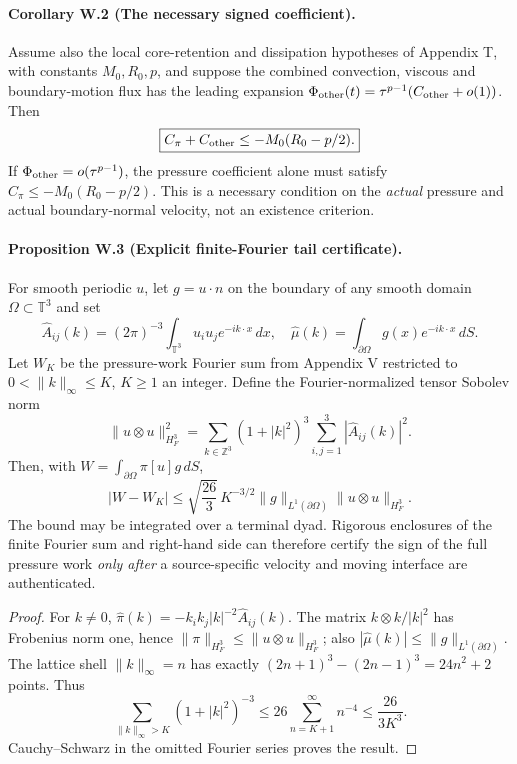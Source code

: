 \paragraph{Corollary W.2 (The necessary signed coefficient).}
Assume also the local core-retention and dissipation hypotheses of Appendix T, with constants $M_0,R_0,p$, and suppose the combined convection, viscous and boundary-motion flux has the leading expansion $\Phi_{\rm other}(t)=\tau^{p-1}(C_{\rm other}+o(1))$. Then
\begin{equation}\label{eq:W-signed-gate}
 \boxed{C_\pi+C_{\rm other}\le-M_0(R_0-p/2).}
\end{equation}
If $\Phi_{\rm other}=o(\tau^{p-1})$, the pressure coefficient alone must satisfy $C_\pi\le -M_0(R_0-p/2)$. This is a necessary condition on the \emph{actual} pressure and actual boundary-normal velocity, not an existence criterion.

\paragraph{Proposition W.3 (Explicit finite-Fourier tail certificate).}
For smooth periodic $u$, let $g=u\cdot n$ on the boundary of any smooth domain $\Omega\subset\mathbb T^3$ and set
\[
 \widehat A_{ij}(k)=(2\pi)^{-3}\int_{\mathbb T^3}u_i u_j e^{-ik\cdot x}\,dx,\quad
 \widehat\mu(k)=\int_{\partial\Omega}g(x)e^{-ik\cdot x}\,dS.
\]
Let $W_K$ be the pressure-work Fourier sum from Appendix V restricted to $0<\|k\|_\infty\le K$, $K\ge1$ an integer. Define the Fourier-normalized tensor Sobolev norm
\[
 \|u\otimes u\|_{H^3_F}^2
 =\sum_{k\in\mathbb Z^3}(1+|k|^2)^3\sum_{i,j=1}^3|\widehat A_{ij}(k)|^2.
\]
Then, with $W=\int_{\partial\Omega}\pi[u]g\,dS$,
\begin{equation}\label{eq:W-tail}
 \boxed{|W-W_K|\le\sqrt{\frac{26}{3}}\,K^{-3/2}
 \|g\|_{L^1(\partial\Omega)}\|u\otimes u\|_{H^3_F}.}
\end{equation}
The bound may be integrated over a terminal dyad. Rigorous enclosures of the finite Fourier sum and right-hand side can therefore certify the sign of the full pressure work \emph{only after} a source-specific velocity and moving interface are authenticated.
\begin{proof}
For $k\ne0$, $\widehat\pi(k)=-k_i k_j|k|^{-2}\widehat A_{ij}(k)$. The matrix $k\otimes k/|k|^2$ has Frobenius norm one, hence $\|\pi\|_{H^3_F}\le\|u\otimes u\|_{H^3_F}$; also $|\widehat\mu(k)|\le\|g\|_{L^1(\partial\Omega)}$. The lattice shell $\|k\|_\infty=n$ has exactly $(2n+1)^3-(2n-1)^3=24n^2+2$ points. Thus
\[
 \sum_{\|k\|_\infty>K}(1+|k|^2)^{-3}
 \le26\sum_{n=K+1}^\infty n^{-4}\le\frac{26}{3K^3}.
\]
Cauchy--Schwarz in the omitted Fourier series proves the result.
\end{proof}

